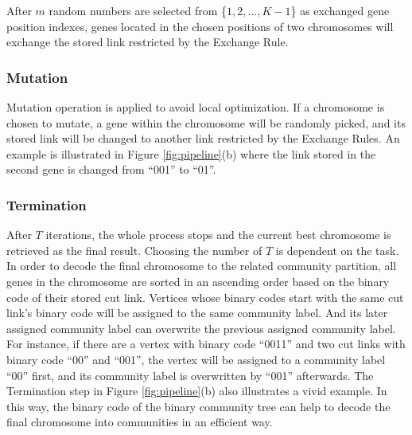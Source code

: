 After \textit{$m$} random numbers are selected from \{$1,2,...,K-1$\} as exchanged gene position indexes, genes located in the chosen positions of two chromosomes will exchange the stored link restricted by the Exchange Rule.
\subsubsection{Mutation} 
Mutation operation is applied to avoid local optimization. If a chromosome is chosen to mutate, a gene within the chromosome will be randomly picked, and its stored link will be changed to another link restricted by the Exchange Rules. An example is illustrated in Figure \ref{fig:pipeline}(b) where the link stored in the second gene is changed from ``001'' to ``01''. 

\subsubsection{Termination}

After $T$ iterations, the whole process stops and the current best chromosome is retrieved as the final result. Choosing the number of $T$ is dependent on the task. In order to decode the final chromosome to the related community partition, all genes in the chromosome are sorted in an ascending order based on the binary code of their stored cut link. Vertices whose binary codes start with the same cut link's binary code will be assigned to the same community label. And its later assigned community label can overwrite the previous assigned community label. For instance, if there are a vertex with binary code ``0011'' and two cut links with binary code ``00'' and ``001'', the vertex will be assigned to a community label ``00'' first, and its community label is overwritten by ``001'' afterwards. The Termination step in Figure \ref{fig:pipeline}(b) also illustrates a vivid example. In this way, the binary code of the binary community tree can help to decode the final chromosome into communities in an efficient way. 
 

